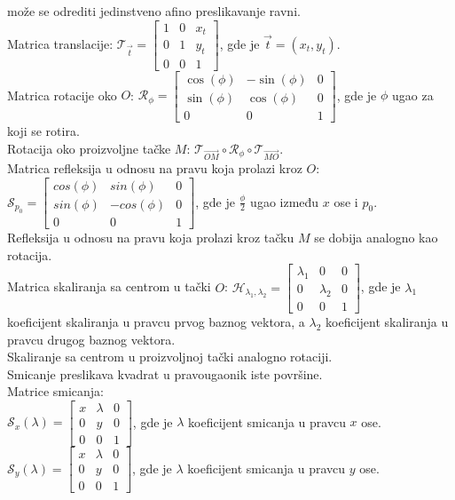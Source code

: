 \documentclass[12pt]{article}
\begin{document}
    može se odrediti jedinstveno afino preslikavanje ravni.\\
    Matrica translacije:
$\mathcal{T}_{\overrightarrow{t}}=\begin{bmatrix}
    1 & 0 & x_t \\
    0 & 1 & y_t \\
    0 & 0 & 1
\end{bmatrix}$, gde je $\overrightarrow{t}=(x_t,y_t)$.\\
    Matrica rotacije oko $O$:
$\mathcal{R}_\phi=\begin{bmatrix}
    \cos(\phi) & -\sin(\phi) & 0 \\
    \sin(\phi) & \cos(\phi)  & 0 \\
    0          & 0           & 1
\end{bmatrix}$, gde je $\phi$ ugao za koji se rotira.\\
    Rotacija oko proizvoljne tačke $M$:
$\mathcal{T}_{\overrightarrow{OM}}\circ\mathcal{R}_\phi\circ\mathcal{T}_{\overrightarrow{MO}}$.\\
    Matrica refleksija u odnosu na pravu koja prolazi kroz $O$:
$\mathcal{S}_{p_0}=\begin{bmatrix}
    cos(\phi) & sin(\phi)  & 0 \\
    sin(\phi) & -cos(\phi) & 0 \\
    0         & 0          & 1
\end{bmatrix}$, gde je $\frac{\phi}{2}$ ugao između $x$ ose i $p_0$.\\
    Refleksija u odnosu na pravu koja prolazi kroz tačku $M$ se dobija analogno kao rotacija.\\
    Matrica skaliranja sa centrom u tački $O$:
$\mathcal{H}_{\lambda_1,\lambda_2}=\begin{bmatrix}
    \lambda_1 & 0         & 0 \\
    0         & \lambda_2 & 0 \\
    0         & 0         & 1
\end{bmatrix}$, gde je $\lambda_1$ koeficijent skaliranja u pravcu
    prvog baznog vektora, a $\lambda_2$ koeficijent skaliranja u pravcu
    drugog baznog vektora.\\
    Skaliranje sa centrom u proizvoljnoj tački analogno rotaciji.\\
    Smicanje preslikava kvadrat u pravougaonik iste površine.\\
    Matrice smicanja:\\
$\mathcal{S}_x(\lambda)=\begin{bmatrix}
    x & \lambda & 0 \\
    0 & y       & 0 \\
    0 & 0       & 1
\end{bmatrix}$, gde je $\lambda$ koeficijent smicanja u pravcu $x$ ose.\\
$\mathcal{S}_y(\lambda)=\begin{bmatrix}
    x & \lambda & 0 \\
    0 & y       & 0 \\
    0 & 0       & 1
\end{bmatrix}$, gde je $\lambda$ koeficijent smicanja u pravcu $y$ ose.
\end{document}
